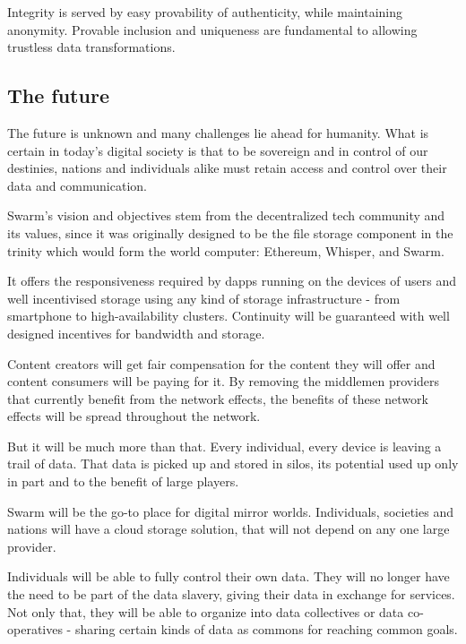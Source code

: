 Integrity is served by easy provability of authenticity, while maintaining anonymity.
Provable inclusion and uniqueness are fundamental to allowing trustless data transformations.


\subsection{The future} \label{sec:future}

The future is unknown and many challenges lie ahead for humanity. What is certain in today's digital society is that to be sovereign and in control of our destinies, nations and individuals alike must retain access and control over their data and communication.

Swarm's vision and objectives stem from the decentralized tech community and its values, since it was originally designed to be the file storage component in the trinity which would form the world computer: Ethereum, Whisper, and Swarm.

It offers the responsiveness required by dapps running on the devices of users and well incentivised storage using any kind of storage infrastructure - from smartphone to high-availability clusters. Continuity will be guaranteed with well designed incentives for bandwidth and storage.

Content creators will get fair compensation for the content they will offer and content consumers will be paying for it. By removing the middlemen providers that currently benefit from the network effects, the benefits of these network effects will be spread throughout the network.

But it will be much more than that. Every individual, every device is leaving a trail of data. That data is picked up and stored in silos, its potential used up only in part and to the benefit of large players.

Swarm will be the go-to place for digital mirror worlds. Individuals, societies and nations will have a cloud storage solution, that will not depend on any one large provider. 


Individuals will be able to fully control their own data. They will no longer have the need to be part of the data slavery, giving their data in exchange for services. Not only that, they will be able to organize into data collectives or data co-operatives - sharing certain kinds of data as commons for reaching common goals. 

